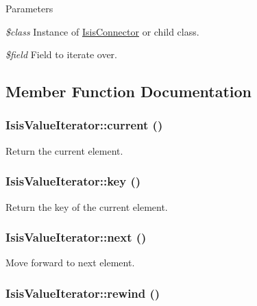 \begin{DoxyParams}{Parameters}
\item[{\em \$class}]Instance of \hyperlink{classIsisConnector}{IsisConnector} or child class.\item[{\em \$field}]Field to iterate over. \end{DoxyParams}


\subsection{Member Function Documentation}
\hypertarget{classIsisValueIterator_ad7c6dd479b6129ba5bfc2f2003f6ca49}{
\subsubsection[{current}]{\setlength{\rightskip}{0pt plus 5cm}IsisValueIterator::current ()}}
\label{classIsisValueIterator_ad7c6dd479b6129ba5bfc2f2003f6ca49}
Return the current element. \hypertarget{classIsisValueIterator_a173b393699278fb2fb928e6bd2448a05}{
\subsubsection[{key}]{\setlength{\rightskip}{0pt plus 5cm}IsisValueIterator::key ()}}
\label{classIsisValueIterator_a173b393699278fb2fb928e6bd2448a05}
Return the key of the current element. \hypertarget{classIsisValueIterator_adc2fb9b1dd029cab4be0b48d6e0f11f9}{
\subsubsection[{next}]{\setlength{\rightskip}{0pt plus 5cm}IsisValueIterator::next ()}}
\label{classIsisValueIterator_adc2fb9b1dd029cab4be0b48d6e0f11f9}
Move forward to next element. \hypertarget{classIsisValueIterator_a175fe47671b335eecc591598053a6a88}{
\subsubsection[{rewind}]{\setlength{\rightskip}{0pt plus 5cm}IsisValueIterator::rewind ()}}
